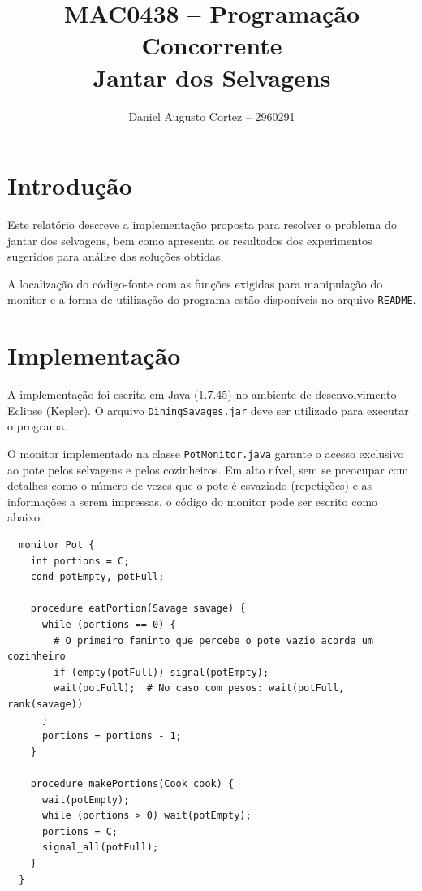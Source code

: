 \documentclass[11pt,a4paper]{article}
\newcommand{\zerar}{\setcounter{equation}{0}\setcounter{figure}{0}\setcounter{table}{0}}
\begin{document}
\title{
  {\sc MAC0438 -- Programação Concorrente} \\ 
  \vspace{0.5cm} 
  {\bf Jantar dos Selvagens}
}
\author{Daniel Augusto Cortez -- 2960291}
\date{}
\maketitle


\zerar
\section{Introdução}
\label{sec:intro}

Este relatório descreve a implementação proposta para resolver o problema do jantar dos selvagens, 
bem como apresenta os resultados dos experimentos sugeridos para análise das soluções obtidas. 

A localização do código-fonte com as funções exigidas para manipulação do monitor e a forma de 
utilização do programa estão disponíveis no arquivo \verb|README|.


\zerar
\section{Implementação}
\label{sec:imp}

A implementação foi escrita em Java (1.7.45) no ambiente de desenvolvimento Eclipse (Kepler). O 
arquivo \verb|DiningSavages.jar| deve ser utilizado para executar o programa.

O monitor implementado na classe \verb|PotMonitor.java| garante o acesso exclusivo ao pote pelos
selvagens e pelos cozinheiros. Em alto nível, sem se preocupar com detalhes como o número de vezes 
que o pote é esvaziado (repetições) e as informações a serem impressas, o código do monitor pode ser 
escrito como abaixo:

\begin{verbatim}
  monitor Pot {
    int portions = C;
    cond potEmpty, potFull;

    procedure eatPortion(Savage savage) {
      while (portions == 0) {
        # O primeiro faminto que percebe o pote vazio acorda um cozinheiro
        if (empty(potFull)) signal(potEmpty);
        wait(potFull);  # No caso com pesos: wait(potFull, rank(savage)) 
      }
      portions = portions - 1;
    }

    procedure makePortions(Cook cook) {
      wait(potEmpty);
      while (portions > 0) wait(potEmpty);
      portions = C;
      signal_all(potFull);
    }
  }
\end{verbatim}
\end{document}
